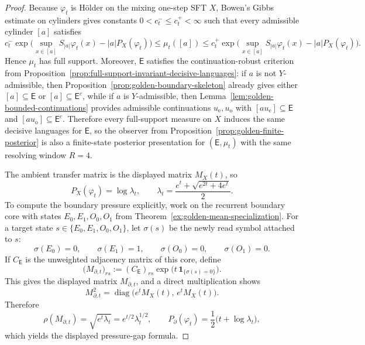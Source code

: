 \documentclass{etds}%
\numberwithin{equation}{section}
\theoremstyle{plain}
\theoremstyle{definition}
\theoremstyle{remark}
\begin{document}
\begin{proof}
Because $\varphi_t$ is H\"older on the mixing one-step SFT $X$, Bowen's Gibbs
estimate on cylinders \cite{Bowen1975,WaltersErgodicTheory} gives constants
$0<c_t^-\le c_t^+<\infty$ such that every admissible cylinder $[a]$ satisfies
\[
c_t^-\exp\!\bigl(\sup_{x\in[a]}S_{|a|}\varphi_t(x)-|a|P_X(\varphi_t)\bigr)
\le \mu_t([a])
\le c_t^+\exp\!\bigl(\sup_{x\in[a]}S_{|a|}\varphi_t(x)-|a|P_X(\varphi_t)\bigr).
\]
Hence $\mu_t$ has full support.  Moreover, $\mathsf{E}$
satisfies the continuation-robust criterion from
Proposition~\ref{prop:full-support-invariant-decisive-languages}: if $a$ is
not $Y$-admissible, then Proposition~\ref{prop:golden-boundary-skeleton}
already gives either $[a]\subseteq\mathsf{E}$ or
$[a]\subseteq\mathsf{E}^c$, while if $a$ is $Y$-admissible, then
Lemma~\ref{lem:golden-bounded-continuations} provides admissible
continuations $u_{\mathrm e},u_{\mathrm o}$ with
$[au_{\mathrm e}]\subseteq\mathsf{E}$ and
$[au_{\mathrm o}]\subseteq\mathsf{E}^c$.  Therefore every full-support measure
on $X$ induces the same decisive languages for $\mathsf{E}$, so the observer
from Proposition~\ref{prop:golden-finite-posterior} is also a finite-state
posterior presentation for $(\mathsf{E},\mu_t)$ with the same resolving
window $R=4$.

The ambient transfer matrix is the displayed matrix $M_X(t)$, so
\[
P_X(\varphi_t)=\log\lambda_t,
\qquad
\lambda_t=\frac{e^t+\sqrt{e^{2t}+4e^t}}{2}.
\]
To compute the boundary pressure explicitly, work on the recurrent boundary
core with states $E_0,E_1,O_0,O_1$ from
Theorem~\ref{ex:golden-mean-specialization}.  For a target state
$s\in\{E_0,E_1,O_0,O_1\}$, let $\sigma(s)$ be the newly read symbol attached
to $s$:
\[
\sigma(E_0)=0,\qquad \sigma(E_1)=1,\qquad \sigma(O_0)=0,\qquad \sigma(O_1)=0.
\]
If $C_{\mathsf{E}}$ is the unweighted adjacency matrix of this core, define
\[
\bigl(M_{\partial,t}\bigr)_{rs}
:=(C_{\mathsf{E}})_{rs}\exp\!\bigl(t\,\mathbf{1}_{\{\sigma(s)=0\}}\bigr).
\]
This gives the displayed matrix $M_{\partial,t}$, and a direct multiplication
shows
\[
M_{\partial,t}^2=\operatorname{diag}\!\bigl(e^tM_X(t),\,e^tM_X(t)\bigr).
\]
Therefore
\[
\rho(M_{\partial,t})=\sqrt{e^t\lambda_t}=e^{t/2}\lambda_t^{1/2},
\qquad
P_\partial(\varphi_t)=\frac12\bigl(t+\log\lambda_t\bigr),
\]
which yields the displayed pressure-gap formula.


\end{proof}
\end{document}
